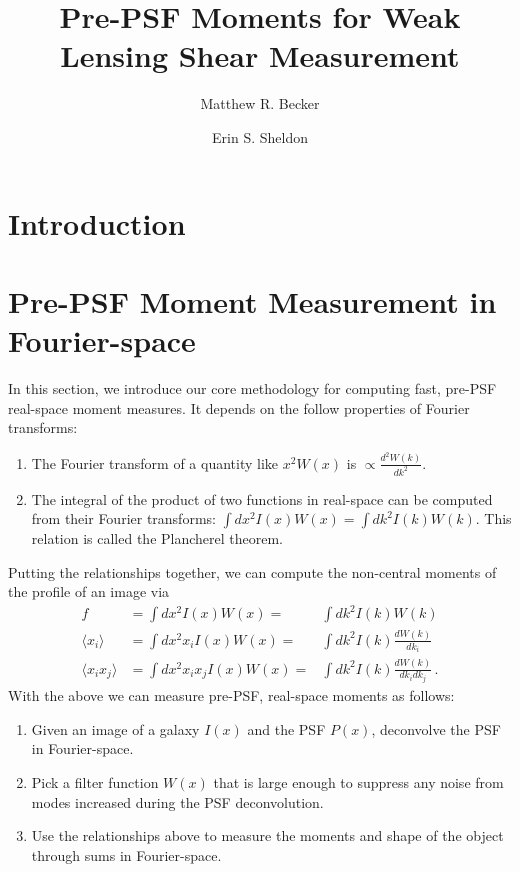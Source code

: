 \documentclass[twocolappendix, appendixfloats, numberedappendix, twocolumn, apj]{openjournal}
\begin{document}
\title{Pre-PSF Moments for Weak Lensing Shear Measurement}

\author{Matthew R. Becker}
\author{Erin S. Sheldon}

\begin{abstract}
\end{abstract}

\section{Introduction}\label{sec:intro}

\section{Pre-PSF Moment Measurement in Fourier-space}

In this section, we introduce our core methodology for computing fast, pre-PSF real-space moment
measures. It depends on the follow properties of Fourier transforms:
\begin{enumerate}
\item The Fourier transform of a quantity like $x^2W(x)$ is $\propto\frac{d^{2}W(k)}{dk^2}$.
\item The integral of the product of two functions in real-space can be computed from their Fourier
      transforms: $\int dx^2 I(x)W(x) = \int dk^2 I(k)W(k)$. This relation is called the Plancherel theorem.
\end{enumerate}
Putting the relationships together, we can compute the non-central moments of the profile of
an image via
\begin{eqnarray}
f                          & = \int dx^2 I(x)W(x) =            & \int dk^2 I(k)W(k) \\
\langle x_{i} \rangle      & = \int dx^2 x_{i} I(x)W(x) =      & \int dk^2 I(k)\frac{dW(k)}{dk_i} \\
\langle x_{i}x_{j} \rangle & = \int dx^2 x_{i}x_{j} I(x)W(x) = & \int dk^2 I(k)\frac{dW(k)}{dk_{i}dk_{j}}\,.
\end{eqnarray}
With the above we can measure pre-PSF, real-space moments as follows:

\begin{enumerate}
\item Given an image of a galaxy $I(x)$ and the PSF $P(x)$, deconvolve the PSF in Fourier-space.
\item Pick a filter function $W(x)$ that is large enough to suppress any noise from modes increased
      during the PSF deconvolution.
\item Use the relationships above to measure the moments and shape of the object through sums in Fourier-space.
\end{enumerate}
\end{document}
